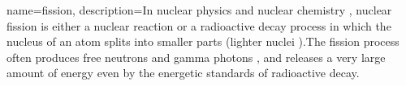 {
    name=fission,
    description={In nuclear physics and nuclear chemistry , nuclear fission is either a nuclear reaction or a radioactive decay process in which the nucleus of an atom splits into smaller parts (lighter nuclei ).The fission process often produces free neutrons and gamma photons , and releases a very large amount of energy even by the energetic standards of radioactive decay.}
    }
